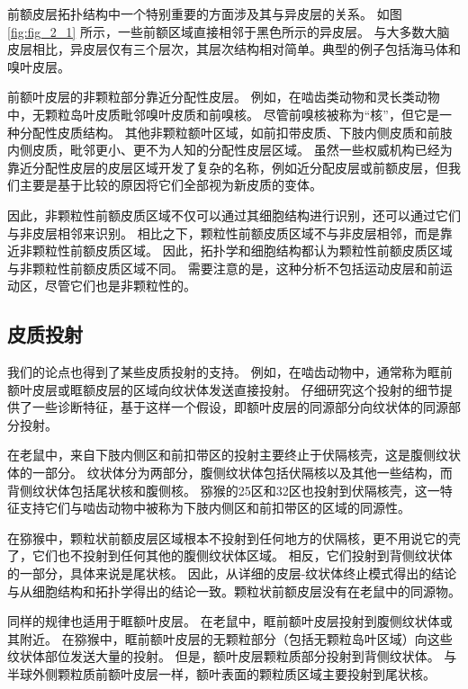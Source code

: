 前额皮层拓扑结构中一个特别重要的方面涉及其与异皮层的关系。
如图 \ref{fig:fig_2_1} 所示，一些前额区域直接相邻于黑色所示的异皮层。
与大多数大脑皮层相比，异皮层仅有三个层次，其层次结构相对简单。典型的例子包括海马体和嗅叶皮层。


前额叶皮层的非颗粒部分靠近分配性皮层。
例如，在啮齿类动物和灵长类动物中，无颗粒岛叶皮质毗邻嗅叶皮质和前嗅核。
尽管前嗅核被称为“核”，但它是一种分配性皮质结构。
其他非颗粒额叶区域，如前扣带皮质、下肢内侧皮质和前肢内侧皮质，毗邻更小、更不为人知的分配性皮层区域。
虽然一些权威机构已经为靠近分配性皮层的皮层区域开发了复杂的名称，例如近分配皮层或前额皮层，但我们主要是基于比较的原因将它们全部视为新皮质的变体。


因此，非颗粒性前额皮质区域不仅可以通过其细胞结构进行识别，还可以通过它们与非皮层相邻来识别。
相比之下，颗粒性前额皮质区域不与非皮层相邻，而是靠近非颗粒性前额皮质区域。
因此，拓扑学和细胞结构都认为颗粒性前额皮质区域与非颗粒性前额皮质区域不同。
需要注意的是，这种分析不包括运动皮层和前运动区，尽管它们也是非颗粒性的。


\subsection{皮质投射}
我们的论点也得到了某些皮质投射的支持。
例如，在啮齿动物中，通常称为眶前额叶皮层或眶额皮层的区域向纹状体发送直接投射。
仔细研究这个投射的细节提供了一些诊断特征，基于这样一个假设，即额叶皮层的同源部分向纹状体的同源部分投射。


在老鼠中，来自下肢内侧区和前扣带区的投射主要终止于伏隔核壳，这是腹侧纹状体的一部分\cite{brog1993patterns,reynolds2005specificity}。
纹状体分为两部分，腹侧纹状体包括伏隔核以及其他一些结构，而背侧纹状体包括尾状核和腹侧核。
猕猴的25区和32区也投射到伏隔核壳\cite{haber1995orbital,haber2006reward}，这一特征支持它们与啮齿动物中被称为下肢内侧区和前扣带区的区域的同源性。


在猕猴中，颗粒状前额皮层区域根本不投射到任何地方的伏隔核，更不用说它的壳了，它们也不投射到任何其他的腹侧纹状体区域。
相反，它们投射到背侧纹状体的一部分，具体来说是尾状核\cite{selemon1985longitudinal}。
因此，从详细的皮层-纹状体终止模式得出的结论与从细胞结构和拓扑学得出的结论一致。颗粒状前额皮层没有在老鼠中的同源物。


同样的规律也适用于眶额叶皮层。
在老鼠中，眶前额叶皮层投射到腹侧纹状体或其附近\cite{berendse1992topographical}。
在猕猴中，眶前额叶皮层的无颗粒部分（包括无颗粒岛叶区域）向这些纹状体部位发送大量的投射。
但是，额叶皮层颗粒质部分投射到背侧纹状体。
与半球外侧颗粒质前额叶皮层一样，额叶表面的颗粒质区域主要投射到尾状核\cite{haber1995orbital,haber2006reward,ferry2000prefrontal,ongur2000organization}。


